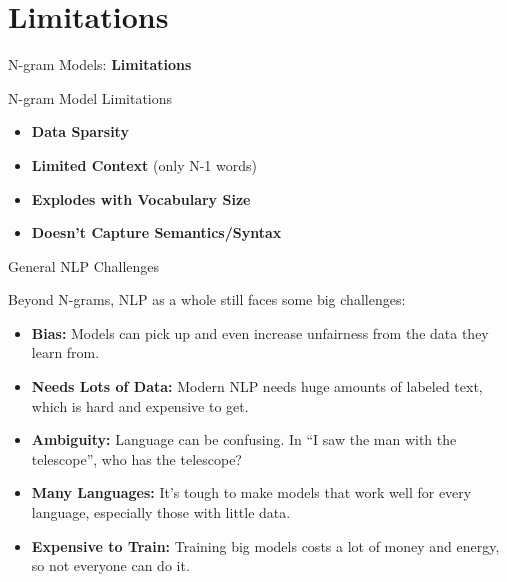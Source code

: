 \section{Limitations}
\begin{frame}{}
    \LARGE N-gram Models: \textbf{Limitations}
\end{frame}

\begin{frame}{N-gram Model Limitations}
    \begin{itemize}
        \item[\faWarning] \textbf{Data Sparsity}
        \item[\faWarning] \textbf{Limited Context} (only N-1 words)
        \item[\faWarning] \textbf{Explodes with Vocabulary Size}
        \item[\faWarning] \textbf{Doesn't Capture Semantics/Syntax}
    \end{itemize}
\end{frame}

\begin{frame}{General NLP Challenges}

Beyond N-grams, NLP as a whole still faces some big challenges:

\begin{itemize}
    \item \textbf{Bias:} Models can pick up and even increase unfairness from the data they learn from.
    \item \textbf{Needs Lots of Data:} Modern NLP needs huge amounts of labeled text, which is hard and expensive to get.
    \item \textbf{Ambiguity:} Language can be confusing. In ``I saw the man with the telescope'', who has the telescope?
    \item \textbf{Many Languages:} It's tough to make models that work well for every language, especially those with little data.
    \item \textbf{Expensive to Train:} Training big models costs a lot of money and energy, so not everyone can do it.
\end{itemize}
\end{frame}

